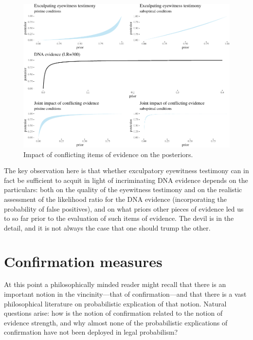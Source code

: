 \documentclass[10pt,dvipsnames,enabledeprecatedfontcommands]{scrartcl}
\begin{document}
\begin{figure}[h]

\begin{center}\includegraphics[width=1\linewidth]{lr-chapter3_files/figure-latex/eyewitness4-1} \end{center}
\caption{Impact of conflicting items of  evidence on the posteriors.}
\label{fig:eyewitness4}
\end{figure}

The key observation here is that whether exculpatory eyewitness
testimony can in fact be sufficient to acquit in light of incriminating
DNA evidence depends on the particulars: both on the quality of the
eyewitness testimony and on the realistic assessment of the likelihood
ratio for the DNA evidence (incorporating the probability of false
positives), and on what priors other pieces of evidence led us to so far
prior to the evaluation of such items of evidence. The devil is in the
detail, and it is not always the case that one should trump the other.

\section{\texorpdfstring{Confirmation measures
\label{sec:confirmation}}{Confirmation measures }}\label{confirmation-measures}

At this point a philosophically minded reader might recall that there is
an important notion in the vincinity---that of confirmation---and that
there is a vast philosophical literature on probabilistic explication of
that notion. Natural questions arise: how is the notion of confirmation
related to the notion of evidence strength, and why almost none of the
probabilistic explications of confirmation have not been deployed in
legal probabilism?
\end{document}
